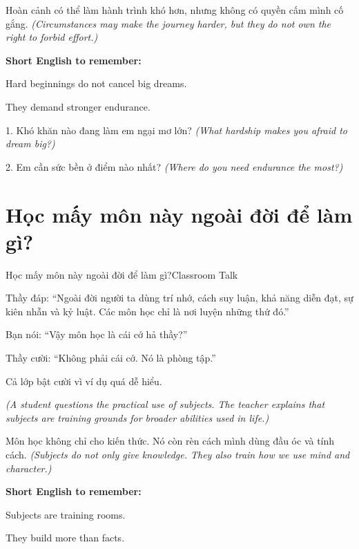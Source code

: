 \begin{baihoc}
Hoàn cảnh có thể làm hành trình khó hơn, nhưng không có quyền cấm mình cố gắng.
\textit{(Circumstances may make the journey harder, but they do not own the right to forbid effort.)}
\end{baihoc}

\begin{ghinhoanh}
\textbf{Short English to remember:}

Hard beginnings do not cancel big dreams.

They demand stronger endurance.
\end{ghinhoanh}

\begin{tuhocnhanh}
1. Khó khăn nào đang làm em ngại mơ lớn? \textit{(What hardship makes you afraid to dream big?)}

2. Em cần sức bền ở điểm nào nhất? \textit{(Where do you need endurance the most?)}
\end{tuhocnhanh}
\ngancach

\section{Học mấy môn này ngoài đời để làm gì?}
\begin{truyen}{Học mấy môn này ngoài đời để làm gì?}{Classroom Talk}

Thầy đáp: ``Ngoài đời người ta dùng trí nhớ, cách suy luận, khả năng diễn đạt, sự kiên nhẫn và kỷ luật. Các môn học chỉ là nơi luyện những thứ đó.''

Bạn nói: ``Vậy môn học là cái cớ hả thầy?''

Thầy cười: ``Không phải cái cớ. Nó là phòng tập.''

Cả lớp bật cười vì ví dụ quá dễ hiểu.

\textit{(A student questions the practical use of subjects. The teacher explains that subjects are training grounds for broader abilities used in life.)}
\end{truyen}

\begin{baihoc}
Môn học không chỉ cho kiến thức. Nó còn rèn cách mình dùng đầu óc và tính cách.
\textit{(Subjects do not only give knowledge. They also train how we use mind and character.)}
\end{baihoc}

\begin{ghinhoanh}
\textbf{Short English to remember:}

Subjects are training rooms.

They build more than facts.
\end{ghinhoanh}

